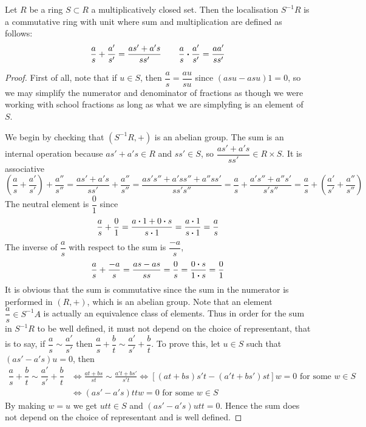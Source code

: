\begin{prop}
	Let $R$ be a ring $S \subset R$ a multiplicatively closed set. Then the localisation $S^{-1} R$ is a commutative ring with unit where sum and multiplication are defined as follows:
	\[
		\frac{a}{s} + \frac{a'}{s'} = \frac{a s' + a' s}{s s'} \qquad
		\frac{a}{s} \vdot \frac{a'}{s'} = \frac{a a'}{s s'}
	\]
\end{prop}
\begin{proof}
	
	First of all, note that if $u \in S$, then $\dfrac{a}{s} = \dfrac{a u}{s u}$ since $(a s u - a s u) 1 = 0$, so we may simplify the numerator and denominator of fractions as though we were working with school fractions as long as what we are simplyfing is an element of $S$.
	
	We begin by checking that $(S^{-1} R, +)$ is an abelian group. The sum is an internal operation because $a s' + a' s \in R$ and $s s' \in S$, so $\dfrac{a s' + a' s}{s s'} \in R \times S$. It is associative
	\[
		\left( \frac{a}{s} + \frac{a'}{s'} \right) + \frac{a''}{s''} = 
		\frac{a s' + a' s}{s s'} + \frac{a''}{s''} = 
		\frac{a s' s'' + a' s s'' + a'' s s'}{s s' s''} = 
		\frac{a}{s} + \frac{a' s'' + a'' s'}{s' s''} = 
		\frac{a}{s} + \left( \frac{a'}{s'} + \frac{a''}{s''} \right)
	\]
	The neutral element is $\dfrac{0}{1}$ since
	\[
		\frac{a}{s} + \frac{0}{1} = 
		\frac{a \vdot 1 + 0 \vdot s}{s \vdot 1} = 
		\frac{a \vdot 1}{s \vdot 1} = 
		\frac{a}{s}
	\]
	The inverse of $\dfrac{a}{s}$ with respect to the sum is $\dfrac{-a}{s}$, 
	\[
		\frac{a}{s} + \frac{-a}{s} = 
		\frac{a s -a s}{s s} = 
		\frac{0}{s} =
		\frac{0 \vdot s}{1 \vdot s} = 
		\frac{0}{1}
	\]
	It is obvious that the sum is commutative since the sum in the numerator is performed in $(R,+)$, which is an abelian group. Note that an element $\dfrac{a}{s} \in S^{-1}A$ is actually an equivalence class of elements. Thus in order for the sum in $S^{-1} R$ to be well defined, it must not depend on the choice of representant, that is to say, if $\dfrac{a}{s} \sim \dfrac{a'}{s'}$ then $\dfrac{a}{s} + \dfrac{b}{t} \sim \dfrac{a'}{s'} + \dfrac{b}{t}$. To prove this, let $u \in S$ such that $(a s' - a' s) u = 0$, then
	\[
		\begin{aligned}
			\dfrac{a}{s} + \dfrac{b}{t} \sim \dfrac{a'}{s'} + \dfrac{b}{t} &\Longleftrightarrow
			\frac{a t + b s}{s t} \sim \frac{a' t + b s'}{s' t} \Longleftrightarrow
			\left[ (a t + b s) s' t - (a' t + b s') s t \right] w = 0 \text{ for some } w \in S \\
			&\Longleftrightarrow
			( a s' - a' s ) t t w = 0 \text{ for some } w \in S
		\end{aligned}
	\]
	By making $w = u$ we get $u t t \in S$ and $( a s' - a' s ) u t t = 0$. Hence the sum does not depend on the choice of representant and is well defined.
	

\end{proof}
